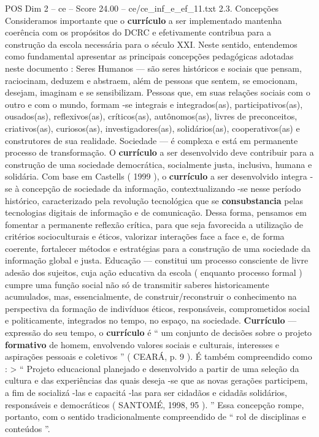 \begin{textsample}{POS Dim 2 – ce – Score 24.00 – ce/ce\_inf\_e\_ef\_11.txt}  \label{ex:f2_pos_088}
2.3.
Concepções Consideramos importante que o \textbf{currículo} a ser implementado mantenha coerência com os propósitos do DCRC e efetivamente contribua para a construção da escola necessária para o século XXI.
Neste sentido, entendemos como fundamental apresentar as principais concepções pedagógicas adotadas neste documento : Seres Humanos — são seres históricos e sociais que pensam, raciocinam, deduzem e abstraem, além de pessoas que sentem, se emocionam, desejam, imaginam e se sensibilizam.
Pessoas que, em suas relações sociais com o outro e com o mundo, formam -se integrais e integrados(as), participativos(as), ousados(as), reflexivos(as), críticos(as), autônomos(as), livres de preconceitos, criativos(as), curiosos(as), investigadores(as), solidários(as), cooperativos(as) e construtores de sua realidade.
Sociedade — é complexa e está em permanente processo de transformação.
O \textbf{currículo} a ser desenvolvido deve contribuir para a construção de uma sociedade democrática, socialmente justa, inclusiva, humana e solidária.
Com base em Castells ( 1999 ), o \textbf{currículo} a ser desenvolvido integra -se à concepção de sociedade da informação, contextualizando -se nesse período histórico, caracterizado pela revolução tecnológica que se \textbf{consubstancia} pelas tecnologias digitais de informação e de comunicação.
Dessa forma, pensamos em fomentar a permanente reflexão crítica, para que seja favorecida a utilização de critérios socioculturais e éticos, valorizar interações face a face e, de forma coerente, fortalecer métodos e estratégias para a construção de uma sociedade da informação global e justa.
Educação — constitui um processo consciente de livre adesão dos sujeitos, cuja ação educativa da escola ( enquanto processo formal ) cumpre uma função social não só de transmitir saberes historicamente acumulados, mas, essencialmente, de construir/reconstruir o conhecimento na perspectiva da formação de indivíduos éticos, responsáveis, comprometidos social e politicamente, integrados no tempo, no espaço, na sociedade. \textbf{Currículo} — expressão do seu tempo, o \textbf{currículo} é “ um conjunto de decisões sobre o projeto \textbf{formativo} de homem, envolvendo valores sociais e culturais, interesses e aspirações pessoais e coletivos ” ( CEARÁ, p. 9 ).
É também compreendido como : > “ Projeto educacional planejado e desenvolvido a partir de uma seleção da cultura e das experiências das quais deseja -se que as novas gerações participem, a fim de socializá -las e capacitá -las para ser cidadãos e cidadãs solidários, responsáveis e democráticos ( SANTOMÉ, 1998, 95 ). ” Essa concepção rompe, portanto, com o sentido tradicionalmente compreendido de “ rol de disciplinas e conteúdos ”.

\end{textsample}
